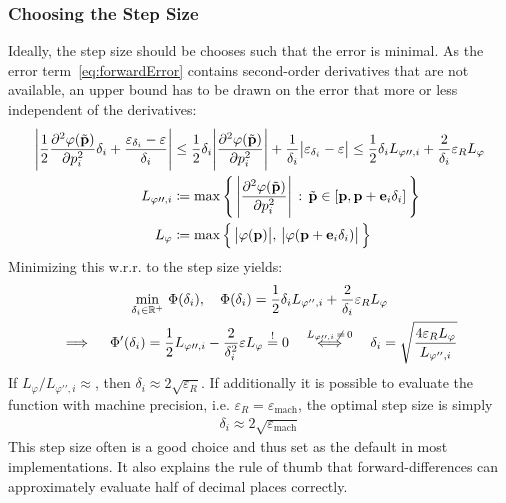 			\subsubsection{Choosing the Step Size}
				Ideally, the step size should be chooses such that the error is minimal. As the error term~\eqref{eq:forwardError} contains second-order derivatives that are not available, an upper bound has to be drawn on the error that more or less independent of the derivatives:
				\begin{align*}
					\Bigg\lvert \frac{1}{2} \pdv[2]{\varphi(\tilde{\boldsymbol{\mathrm{p}}})}{p_i} \delta_i + \frac{\varepsilon_{\delta_i} - \varepsilon}{\delta_i} \Bigg\rvert
						&\leq \frac{1}{2} \delta_i \Bigg\lvert \pdv[2]{\varphi(\tilde{\boldsymbol{\mathrm{p}}})}{p_i} \Bigg\rvert + \frac{1}{\delta_i} \big\lvert \varepsilon_{\delta_i} - \varepsilon \big\rvert
						\leq \frac{1}{2} \delta_i L_{\varphi\prime\prime, i} + \frac{2}{\delta_i} \varepsilon_R L_\varphi \\
					L_{\varphi\prime\prime, i} &\coloneqq \max\Bigg\{\, \Bigg\lvert \pdv[2]{\varphi(\tilde{\boldsymbol{\mathrm{p}}})}{p_i} \Bigg\rvert \,:\, \tilde{\boldsymbol{\mathrm{p}}} \in [\boldsymbol{\mathrm{p}}, \boldsymbol{\mathrm{p}} + \boldsymbol{\mathrm{e}}_i \delta_i] \,\Bigg\} \\
					L_\varphi &\coloneqq \max\Big\{\, \big\lvert \varphi(\boldsymbol{\mathrm{p}}) \big\rvert,\, \big\lvert \varphi(\boldsymbol{\mathrm{p}} + \boldsymbol{\mathrm{e}}_i \delta_i) \big\rvert \,\Big\}
				\end{align*}
				Minimizing this w.r.r. to the step size yields:
				\begin{gather*}
					\min_{\delta_i \in \mathbb{R}^+} \, \Phi(\delta_i),\quad \Phi(\delta_i) = \frac{1}{2} \delta_i L_{\varphi'', i} + \frac{2}{\delta_i} \varepsilon_R L_\varphi \\
					\implies\quad \Phi'(\delta_i) = \frac{1}{2} L_{\varphi\prime\prime, i} - \frac{2}{\delta_i^2} \varepsilon L_\varphi \overset{!}{=} 0
					\quad\overset{L_{\varphi\prime\prime, i} \,\neq\, 0}{\iff}\quad \delta_i = \sqrt{\frac{4 \varepsilon_R L_\varphi}{L_{\varphi'', i}}}
				\end{gather*}
				If \( L_\varphi / L_{\varphi\prime\prime, i} \approx \), then \( \delta_i \approx 2 \sqrt{\varepsilon_R} \). If additionally it is possible to evaluate the function with machine precision, i.e. \( \varepsilon_R = \varepsilon_\mathrm{mach} \), the optimal step size is simply
				\begin{align*}
					\delta_i \approx 2 \sqrt{\varepsilon_\mathrm{mach}}
				\end{align*}
				This step size often is a good choice and thus set as the default in most implementations. It also explains the rule of thumb that forward-differences can approximately evaluate half of decimal places correctly.
			

